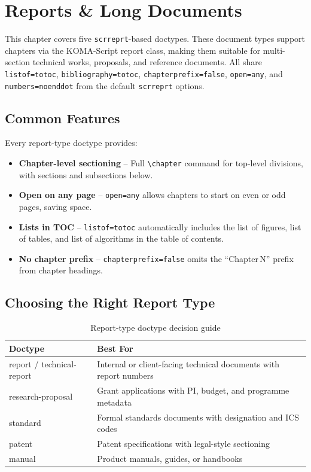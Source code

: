 \chapter{Reports \& Long Documents}
\label{ch:reports}

This chapter covers five \texttt{scrreprt}-based doctypes.  These document
types support chapters via the KOMA-Script report class, making them suitable
for multi-section technical works, proposals, and reference documents.  All
share \texttt{listof=totoc}, \texttt{bibliography=totoc},
\texttt{chapterprefix=false}, \texttt{open=any}, and
\texttt{numbers=noenddot} from the default \texttt{scrreprt} options.

\section{Common Features}

Every report-type doctype provides:

\begin{itemize}
    \item \textbf{Chapter-level sectioning} -- Full
          \texttt{\textbackslash chapter} command for top-level divisions,
          with sections and subsections below.
    \item \textbf{Open on any page} -- \texttt{open=any} allows chapters
          to start on even or odd pages, saving space.
    \item \textbf{Lists in TOC} -- \texttt{listof=totoc} automatically
          includes the list of figures, list of tables, and list of
          algorithms in the table of contents.
    \item \textbf{No chapter prefix} -- \texttt{chapterprefix=false}
          omits the ``Chapter\,N'' prefix from chapter headings.
\end{itemize}

\section{Choosing the Right Report Type}

\begin{table}[htbp]
    \centering
    \caption{Report-type doctype decision guide}
    \label{tab:report-decision}
    \begin{tabular}{@{} l p{6.5cm} @{}}
        \toprule
        \textbf{Doctype} & \textbf{Best For} \\
        \midrule
        report / technical-report & Internal or client-facing technical documents with report numbers \\
        research-proposal         & Grant applications with PI, budget, and programme metadata \\
        standard                  & Formal standards documents with designation and ICS codes \\
        patent                    & Patent specifications with legal-style sectioning \\
        manual                    & Product manuals, guides, or handbooks \\
        \bottomrule
    \end{tabular}
\end{table}

